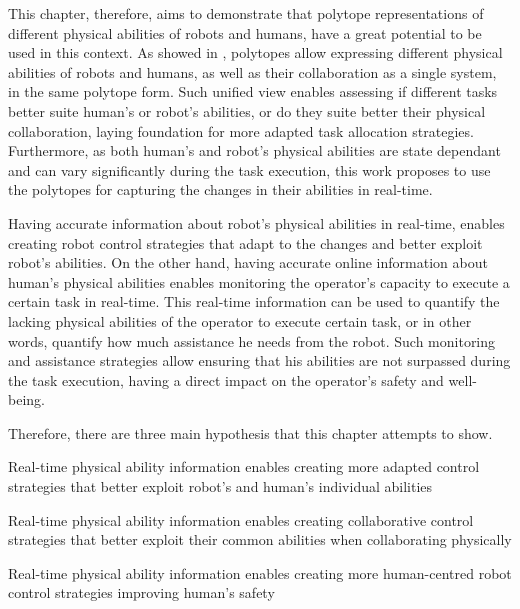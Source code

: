 This chapter, therefore, aims to demonstrate that polytope representations of different physical abilities of robots and humans, have a great potential to be used in this context. As showed in , polytopes allow expressing different physical abilities of robots and humans, as well as their collaboration as a single system, in the same polytope form. Such unified view enables assessing if different tasks better suite human's or robot's abilities, or do they suite better their physical collaboration, laying foundation for more adapted task allocation strategies. Furthermore, as both human's and robot's physical abilities are state dependant and can vary significantly during the task execution, this work proposes to use the polytopes for capturing the changes in their abilities in real-time. 

Having accurate information about robot's physical abilities in real-time, enables creating robot control strategies that adapt to the changes and better exploit robot's abilities. On the other hand, having accurate online information about human's physical abilities enables monitoring the operator's capacity to execute a certain task in real-time. This real-time information can be used to quantify the lacking physical abilities of the operator to execute certain task, or in other words, quantify how much assistance he needs from the robot. Such monitoring and assistance strategies allow ensuring that his abilities are not surpassed during the task execution, having a direct impact on the operator's safety and well-being. 


Therefore, there are three main hypothesis that this chapter attempts to show. 
\begin{hypothesis} \label{hyp:individual_capacity} Real-time physical ability information enables creating more adapted control strategies that better exploit robot's and human's individual abilities
\end{hypothesis}

\begin{hypothesis} \label{hyp:common_capacity} Real-time physical ability information enables creating  collaborative control strategies that better exploit their common abilities when collaborating physically
\end{hypothesis}

\begin{hypothesis} \label{hyp:safety} Real-time physical ability information enables creating  more human-centred robot control strategies improving human's safety
\end{hypothesis}

